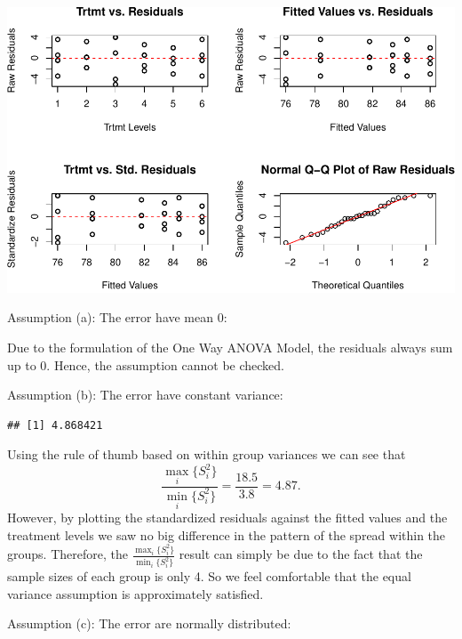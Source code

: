 \documentclass[12pt,]{article}
\newenvironment{Shaded}{\begin{snugshade}}{\end{snugshade}}
\newcommand{\KeywordTok}[1]{\textcolor[rgb]{0.13,0.29,0.53}{\textbf{#1}}}
\newcommand{\StringTok}[1]{\textcolor[rgb]{0.31,0.60,0.02}{#1}}
\newcommand{\OperatorTok}[1]{\textcolor[rgb]{0.81,0.36,0.00}{\textbf{#1}}}
\newcommand{\NormalTok}[1]{#1}
\begin{document}
\includegraphics{Markdown_HW_5_files/figure-latex/unnamed-chunk-5-1.pdf}

Assumption (a): The error have mean 0:

Due to the formulation of the One Way ANOVA Model, the residuals always
sum up to 0. Hence, the assumption cannot be checked.

Assumption (b): The error have constant variance:

\begin{Shaded}
\end{Shaded}

\begin{verbatim}
## [1] 4.868421
\end{verbatim}

Using the rule of thumb based on within group variances we can see that
\[\frac{\max_i\{S_i^2 \}}{\min_i\{S_i^2 \}} =\frac{18.5}{3.8} = 4.87.\]
However, by plotting the standardized residuals against the fitted
values and the treatment levels we saw no big difference in the pattern
of the spread within the groups. Therefore, the
\(\frac{\max_i\{S_i^2 \}}{\min_i\{S_i^2 \}}\) result can simply be due
to the fact that the sample sizes of each group is only 4. So we feel
comfortable that the equal variance assumption is approximately
satisfied.

Assumption (c): The error are normally distributed:
\end{document}

